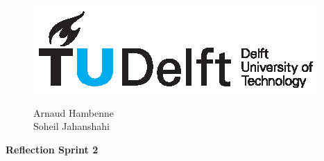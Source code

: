\documentclass[11pt]{article}
\begin{document}
\thispagestyle{fancy}
\begin{figure}
    \begin{minipage}[H]{0.33\textwidth}
		\vspace{0.3cm}
		\includegraphics[scale=0.8]{img/TUDelftLogo.eps}
	\end{minipage}
	\begin{minipage}[H]{0.34\textwidth}
		\begin{center}
			\selectfont \textcolor{blue}{}
		\end{center}
		
	
	\end{minipage}
	\begin{minipage}[H]{0.33\textwidth}
			\begin{flushright}

				\small{Arnaud Hambenne }\\
				\small{Soheil Jahanshahi }\\
				

			\end{flushright}
			
	\end{minipage}
\end{figure}


\begin{minipage}[H]{\textwidth}
\vspace{0.3cm}
		\begin{center}
		
		\vspace{0.3cm}
			\Large{\selectfont \textbf{Reflection Sprint 2}}\\
		\vspace{0.3cm}	
		
		\vspace{0.7cm}	
		\end{center}
	\end{minipage}
\end{document}
